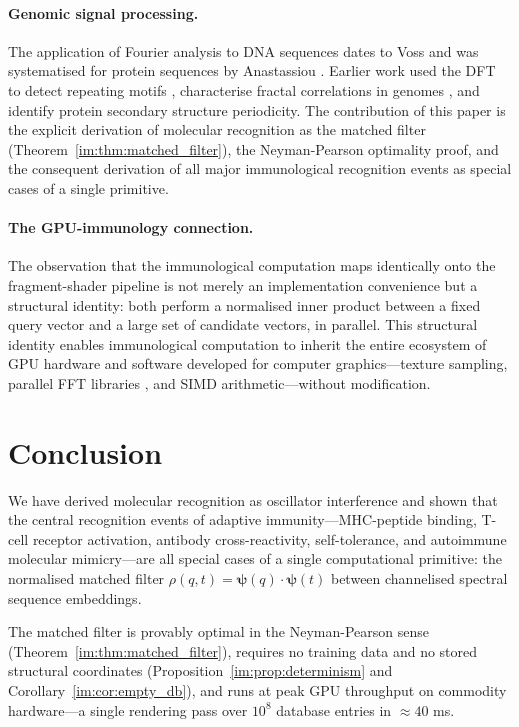 \paragraph{Genomic signal processing.}
The application of Fourier analysis to DNA sequences dates to Voss
\citep{voss1992} and was systematised for protein sequences by Anastassiou
\citep{anastassiou2001}. Earlier work used the DFT to detect repeating motifs
\citep{trifonov1980}, characterise fractal correlations in genomes
\citep{voss1992}, and identify protein secondary structure periodicity. The
contribution of this paper is the explicit derivation of molecular recognition
as the matched filter (Theorem~\ref{im:thm:matched_filter}), the Neyman-Pearson
optimality proof, and the consequent derivation of all major immunological
recognition events as special cases of a single primitive.

\paragraph{The GPU-immunology connection.}
The observation that the immunological computation maps identically onto the
fragment-shader pipeline is not merely an implementation convenience but a
structural identity: both perform a normalised inner product between a fixed
query vector and a large set of candidate vectors, in parallel. This
structural identity enables immunological computation to inherit the entire
ecosystem of GPU hardware and software developed for computer graphics---texture
sampling, parallel FFT libraries \citep{moreland2003,govindaraju2008}, and
SIMD arithmetic---without modification.

\section{Conclusion}
\label{im:sec:conclusion}

We have derived molecular recognition as oscillator interference and shown
that the central recognition events of adaptive immunity---MHC-peptide binding,
T-cell receptor activation, antibody cross-reactivity, self-tolerance, and
autoimmune molecular mimicry---are all special cases of a single computational
primitive: the normalised matched filter
$\rho(q,t) = \bm{\psi}(q)\cdot\bm{\psi}(t)$
between channelised spectral sequence embeddings.

The matched filter is provably optimal in the Neyman-Pearson sense
(Theorem~\ref{im:thm:matched_filter}), requires no training data and no stored
structural coordinates (Proposition~\ref{im:prop:determinism} and
Corollary~\ref{im:cor:empty_db}), and runs at peak GPU throughput on commodity
hardware---a single rendering pass over $10^8$ database entries in
$\approx 40$ ms.


